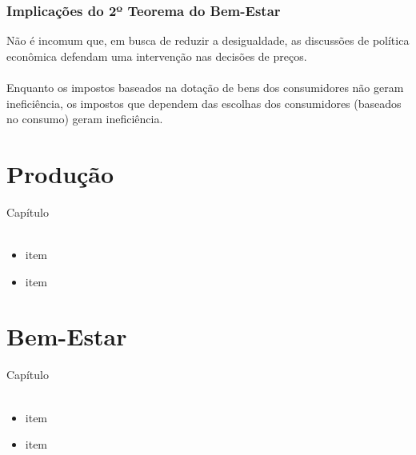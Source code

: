\documentclass{beamer}[10]
\begin{document}
\begin{frame}
	\frametitle{Implicações do 2º Teorema do Bem-Estar}

	Não é incomum que, em busca de reduzir a desigualdade, as discussões de política econômica defendam uma intervenção nas decisões de preços.
	\\~\\
	Enquanto os impostos baseados na dotação de bens dos consumidores não geram ineficiência, os impostos que dependem das escolhas dos consumidores (baseados no consumo) geram ineficiência.

\end{frame}

\section[Produção]{Produção}
\begin{frame}
	\huge Capítulo \normalsize
	\\~\\
	\begin{itemize}
		\item item
		\item item
	\end{itemize}
\end{frame}


\begin{frame}
	\frametitle{}

	

\end{frame}

\section[Bem-Estar]{Bem-Estar}
\begin{frame}
	\huge Capítulo \normalsize
	\\~\\
	\begin{itemize}
		\item item
		\item item
	\end{itemize}
\end{frame}


\begin{frame}
	\frametitle{}

	

\end{frame}
\end{document}
